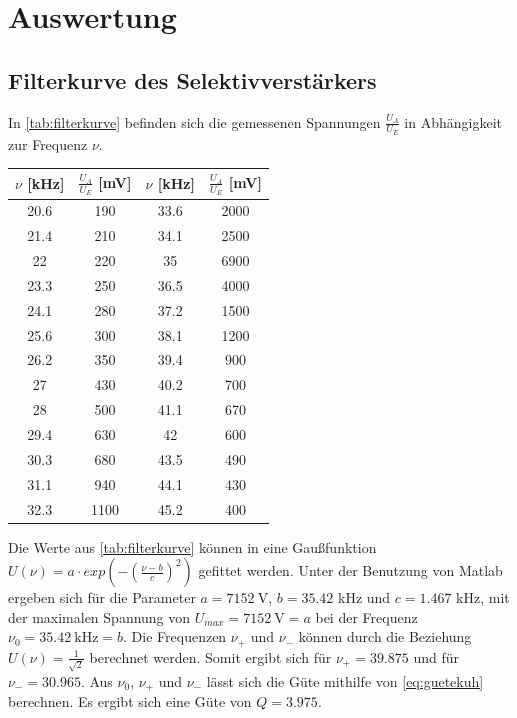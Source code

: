 


\section{Auswertung}

\subsection{Filterkurve des Selektivverstärkers}
In \autoref{tab:filterkurve} befinden sich die gemessenen Spannungen $\frac{U_{A}}{U_{E}}$ in Abhängigkeit zur Frequenz $\nu$.
\begin{table}[H]
 \centering 
 \begin{tabular}{cccc} \toprule
 $\nu$ [kHz]& $\frac{U_{A}}{U_{E}}$ [mV] & $\nu$ [kHz]& $\frac{U_{A}}{U_{E}}$ [mV]\\  \midrule
 20.6 & 190 & 33.6 & 2000\\ 
 21.4 & 210 & 34.1 & 2500\\ 
 22   & 220 & 35   & 6900\\
 23.3 & 250 & 36.5 & 4000\\
 24.1 & 280 & 37.2 & 1500\\
 25.6 & 300 & 38.1 & 1200\\
 26.2 & 350 & 39.4 & 900\\
 27   & 430 & 40.2 & 700\\
 28   & 500 & 41.1 & 670\\
 29.4 & 630 & 42   & 600\\
 30.3 & 680 & 43.5 & 490\\
 31.1 & 940 & 44.1 & 430\\
 32.3 & 1100 & 45.2 & 400\\ \bottomrule
 \end{tabular} 
 \label{tab:filterkurve}
\end{table} 
Die Werte aus \autoref{tab:filterkurve} können in eine Gaußfunktion $U(\nu)=a\cdot exp(-(\frac{\nu-b}{c})^2)$ gefittet werden. 
Unter der Benutzung von Matlab ergeben sich für die Parameter $a=7152\ \si{\V}$, $b=35.42$ kHz und $c=1.467$ kHz, 
mit der maximalen Spannung von $U_{max}=7152\ \si{\V}=a$ bei der Frequenz $\nu_{0}=35.42\ \si{\kHz}=b$. 
Die Frequenzen $\nu_{+}$ und $\nu_{-}$ können durch die Beziehung $U(\nu)=\frac{1}{\sqrt{2}}$ berechnet werden. 
Somit ergibt sich für $\nu_{+}=39.875$ und für $\nu_{-}=30.965$. 
Aus $\nu_{0}$, $\nu_{+}$ und $\nu_{-}$ lässt sich die Güte mithilfe von \autoref{eq:guetekuh}
berechnen. Es ergibt sich eine Güte von $Q=3.975$.
